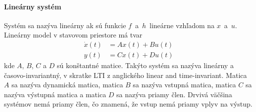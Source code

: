 \documentclass[a4paper, 10pt, ]{article}
\begin{document}
\paragraph{Lineárny systém}

Systém sa nazýva lineárny ak sú funkcie $f$~a~$h$~lineárne vzhľadom na $x$~a~$u$. Lineárny model v stavovom priestore má tvar
\begin{subequations} \label{LinearLTIsyst}
\begin{align}
	\dot x(t) &= Ax(t) + Bu(t) \\
	y(t) &= Cx(t) + Du(t)
\end{align}
\end{subequations}
kde $A$, $B$, $C$ a $D$ sú konštantné matice. Takýto systém sa nazýva lineárny a časovo-invariantný, v skratke LTI z anglického linear and time-invariant. Matica $A$ sa nazýva dynamická matica, matica $B$ sa nazýva vstupná matica, matica $C$ sa nazýva výstupná matica a matica $D$ sa nazýva priamy člen. Drvivá väčšina systémov nemá priamy člen, čo znamená, že vstup nemá priamy vplyv na výstup.
\end{document}
